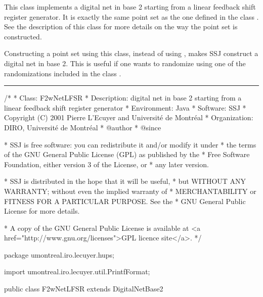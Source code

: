 
This class implements a digital net in base 2 starting from a
linear feedback shift register generator.  It is exactly the same
point set as the one defined in the class 
. 
 See the description
of this class for more details on the way the point set is constructed.

Constructing a point set using this class, instead of using
 ,
makes SSJ construct a digital net in base 2.  This is useful if one
wants to randomize using one of the randomizations included in the class
.

\bigskip\hrule\bigskip

\begin{code}
\begin{hide}
/*
 * Class:        F2wNetLFSR
 * Description:  digital net in base 2 starting from a linear feedback
                 shift register generator
 * Environment:  Java
 * Software:     SSJ 
 * Copyright (C) 2001  Pierre L'Ecuyer and Université de Montréal
 * Organization: DIRO, Université de Montréal
 * @author       
 * @since

 * SSJ is free software: you can redistribute it and/or modify it under
 * the terms of the GNU General Public License (GPL) as published by the
 * Free Software Foundation, either version 3 of the License, or
 * any later version.

 * SSJ is distributed in the hope that it will be useful,
 * but WITHOUT ANY WARRANTY; without even the implied warranty of
 * MERCHANTABILITY or FITNESS FOR A PARTICULAR PURPOSE.  See the
 * GNU General Public License for more details.

 * A copy of the GNU General Public License is available at
   <a href="http://www.gnu.org/licenses">GPL licence site</a>.
 */
\end{hide}
package umontreal.iro.lecuyer.hups; \begin{hide} 

import umontreal.iro.lecuyer.util.PrintfFormat;
\end{hide}

public class F2wNetLFSR extends DigitalNetBase2 \begin{hide} 
{
   private F2wStructure param;

    /**
     * Constructs and stores the set of cycles for an LCG with
     *    modulus <SPAN CLASS="MATH"><I>n</I></SPAN> and multiplier <SPAN CLASS="MATH"><I>a</I></SPAN>.
     *   If pgcd<SPAN CLASS="MATH">(<I>a</I>, <I>n</I>) = 1</SPAN>, this constructs a full-period LCG which has two
     *   cycles, one containing 0 and one, the LCG period.
     *
     * @param n required number of points and modulo of the LCG
     *
     *    @param a generator <SPAN CLASS="MATH"><I>a</I></SPAN> of the LCG
     *
     *
     */
\end{hide}
\end{code}

